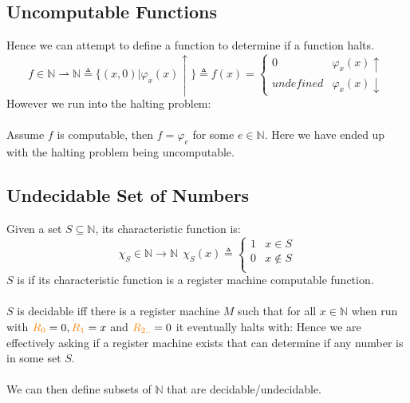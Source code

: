 \documentclass{report}
\begin{document}
\subsection*{Uncomputable Functions}
Hence we can attempt to define a function to determine if a function halts.
\[f \in \mathbb{N} \rightharpoonup \mathbb{N} \triangleq \{(x,0) | \varphi_x(x)\uparrow\} \triangleq f(x) = \begin{cases}
		0         & \varphi_x(x)\uparrow   \\
		undefined & \varphi_x(x)\downarrow
	\end{cases}\]
However we run into the halting problem:
\\
\\ Assume $f$ is computable, then $f = \varphi_e$ for some $e \in \mathbb{N}$.
Here we have ended up with the halting problem being uncomputable.

\subsection*{Undecidable Set of Numbers}
Given a set $S \subseteq \mathbb{N}$, its characteristic function is:
\[\chi_S \in \mathbb{N} \to \mathbb{N} \ \ \chi_S(x) \triangleq \begin{cases}
		1 & x \in S     \\
		0 & x \not\in S \\
	\end{cases}\]
$S$ is  if its characteristic function is a register machine computable function.
\\
\\ $S$ is decidable iff there is a register machine $M$ such that for all $x \in \mathbb{N}$ when run with $\text{\textcolor{orange}{$R_{0}$}} = 0, \text{\textcolor{orange}{$R_{1}$}} = x$ and $\text{\textcolor{orange}{$R_{2..}$}} = 0$ it eventually halts with:
Hence we are effectively asking if a register machine exists that can determine if any number is in some set $S$.
\\
\\ We can then define subsets of $\mathbb{N}$ that are decidable/undecidable.
\end{document}
